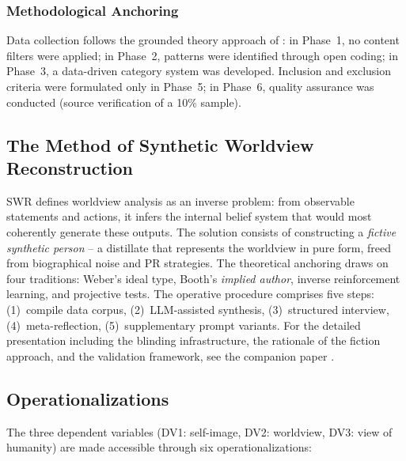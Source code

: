 \documentclass[12pt,a4paper]{article}
\begin{document}
\subsubsection{Methodological Anchoring}

Data collection follows the grounded theory approach of \citet{StraussCorbin1990}: in Phase~1, no content filters were applied; in Phase~2, patterns were identified through open coding; in Phase~3, a data-driven category system was developed. Inclusion and exclusion criteria were formulated only in Phase~5; in Phase~6, quality assurance was conducted (source verification of a 10\% sample).


\subsection{The Method of Synthetic Worldview Reconstruction}
\label{sec:methodik:swr}

SWR defines worldview analysis as an inverse problem: from observable statements and actions, it infers the internal belief system that would most coherently generate these outputs. The solution consists of constructing a \emph{fictive synthetic person} -- a distillate that represents the worldview in pure form, freed from biographical noise and PR strategies. The theoretical anchoring draws on four traditions: Weber's ideal type, Booth's \emph{implied author}, inverse reinforcement learning, and projective tests. The operative procedure comprises five steps: (1)~compile data corpus, (2)~LLM-assisted synthesis, (3)~structured interview, (4)~meta-reflection, (5)~supplementary prompt variants. For the detailed presentation including the blinding infrastructure, the rationale of the fiction approach, and the validation framework, see the companion paper \citep{Geiger2026SWR}.


\subsection{Operationalizations}
\label{sec:methodik:ops}

The three dependent variables (DV1: self-image, DV2: worldview, DV3: view of humanity) are made accessible through six operationalizations:
\end{document}
